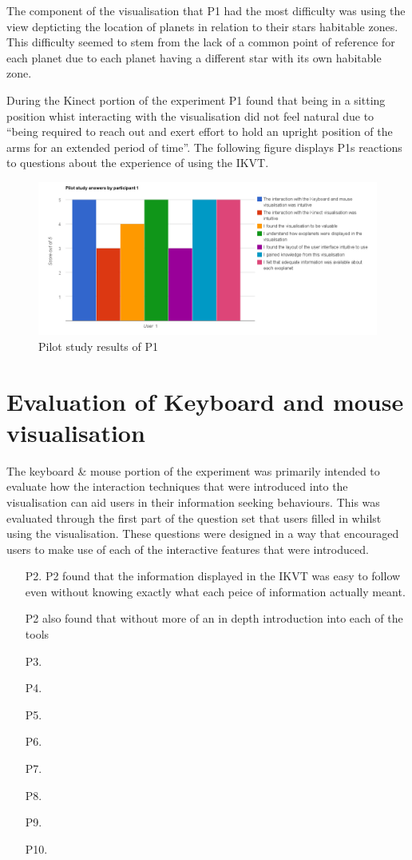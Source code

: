 The component of the visualisation that P1 had the most difficulty was using the view depticting the location of planets in relation to their stars habitable zones. This difficulty seemed to stem from the lack of a common point of reference for each planet due to each planet having a different star with its own habitable zone.

During the Kinect portion of the experiment P1 found that being in a sitting position whist interacting with the visualisation did not feel natural due to ``being required to reach out and exert effort to hold an upright position of the arms for an extended period of time''. The following figure displays P1s reactions to questions about the experience of using the IKVT.
\begin{figure}[H]
  \centering
      \includegraphics[width=1\textwidth]{images/pilot.jpg}
  \caption{Pilot study results of P1}  
    \label{fig:pilot}
\end{figure}



\section{Evaluation of Keyboard and mouse visualisation}
The keyboard \& mouse portion of the experiment was primarily intended to
evaluate how the interaction techniques that were introduced into the
visualisation can aid users in their information seeking behaviours.
This was evaluated through the first part of the question set that users filled
in whilst using the visualisation. These questions were designed in a way that
encouraged users to make use of each of the interactive features that were
introduced.

\begin{enumerate}
 \item[P2.] 
 P2 found that the information displayed in the IKVT was easy to follow even without knowing exactly what each peice of information actually meant.
 
 P2 also found that without more of an in depth introduction into each of the tools 
  \item[P3.]
   \item[P4.]
    \item[P5.]
     \item[P6.]
      \item[P7.]
       \item[P8.]
        \item[P9.]
         \item[P10.]
\end{enumerate}

